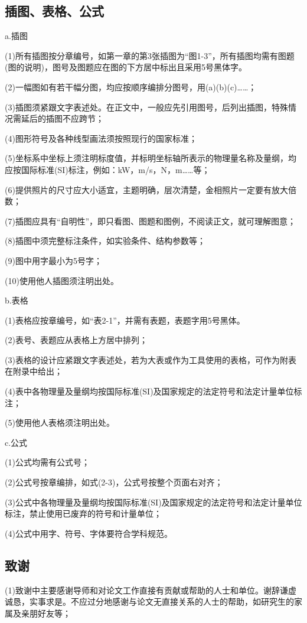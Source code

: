 \subsection{插图、表格、公式}
\noindent \hspace{1em}a.插图

(1)所有插图按分章编号，如第一章的第3张插图为“图1-3”，所有插图均需有图题(图的说明)，图号及图题应在图的下方居中标出且采用5号黑体字。

(2)一幅图如有若干幅分图，均应按顺序编排分图号，用(a)(b)(c)……；

(3)插图须紧跟文字表述处。在正文中，一般应先引用图号，后列出插图，特殊情况需延后的插图不应跨节；

(4)图形符号及各种线型画法须按照现行的国家标准；

(5)坐标系中坐标上须注明标度值，并标明坐标轴所表示的物理量名称及量纲，均应按国际标准(SI)标注，例如：kW，m/s，N，m……等；

(6)提供照片的尺寸应大小适宜，主题明确，层次清楚，金相照片一定要有放大倍数；

(7)插图应具有“自明性”，即只看图、图题和图例，不阅读正文，就可理解图意；

(8)插图中须完整标注条件，如实验条件、结构参数等；

(9)图中用字最小为5号字；

(10)使用他人插图须注明出处。

\noindent \hspace{1em}b.表格

(1)表格应按章编号，如“表2-1”，并需有表题，表题字用5号黑体。

(2)表号、表题应从表格上方居中排列；

(3)表格的设计应紧跟文字表述处，若为大表或作为工具使用的表格，可作为附表在附录中给出；

(4)表中各物理量及量纲均按国际标准(SI)及国家规定的法定符号和法定计量单位标注；

(5)使用他人表格须注明出处。

\noindent \hspace{1em}c.公式

(1)公式均需有公式号；

(2)公式号按章编排，如式(2-3)，公式号按整个页面右对齐；

(3)公式中各物理量及量纲均按国际标准(SI)及国家规定的法定符号和法定计量单位标注，禁止使用已废弃的符号和计量单位；

(4)公式中用字、符号、字体要符合学科规范。

\subsection{致谢}
(1)致谢中主要感谢导师和对论文工作直接有贡献或帮助的人士和单位。谢辞谦虚诚恳，实事求是。不应过分地感谢与论文无直接关系的人士的帮助，如研究生的家属及亲朋好友等；

